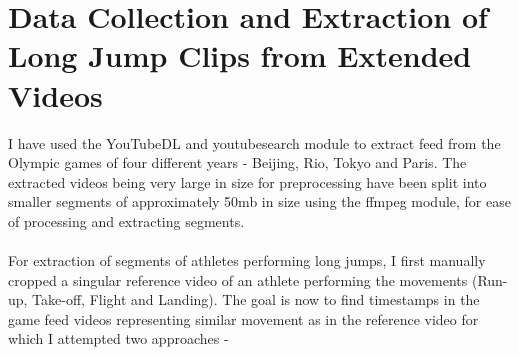 \documentclass[12pt, letterpaper]{article}
\begin{document}
 \section{Data Collection and Extraction of Long Jump Clips from Extended Videos}
I have used the YouTubeDL and youtubesearch module to extract feed from
the Olympic games of four different years - Beijing, Rio, Tokyo and Paris.
The extracted videos being very large in size for preprocessing have been split
into smaller segments of approximately 50mb in size using the ffmpeg module,
 for ease of processing and extracting segments.
 \\\\For extraction of segments of athletes performing long jumps, 
 I first manually cropped a singular reference video of an athlete performing 
 the movements (Run-up, Take-off, Flight and Landing). The goal is now to find timestamps
 in the game feed videos representing similar movement as in the reference video for which I attempted two approaches - 
\end{document}
